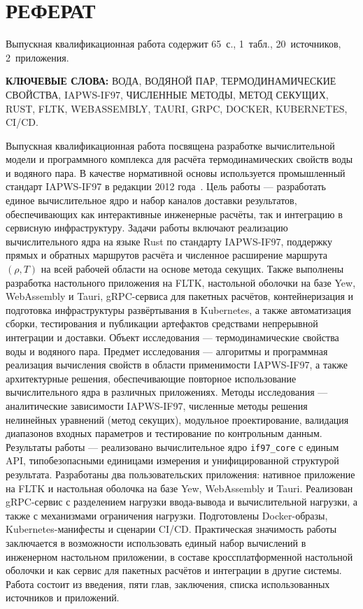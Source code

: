 \clearpage
\chapter*{РЕФЕРАТ}
Выпускная квалификационная работа содержит 65~с., 1~табл., 20~источников, 2~приложения.

\textbf{КЛЮЧЕВЫЕ СЛОВА:} ВОДА, ВОДЯНОЙ ПАР, ТЕРМОДИНАМИЧЕСКИЕ СВОЙСТВА, IAPWS-IF97, ЧИСЛЕННЫЕ МЕТОДЫ, МЕТОД СЕКУЩИХ, RUST, FLTK, WEBASSEMBLY, TAURI, GRPC, DOCKER, KUBERNETES, CI/CD.

Выпускная квалификационная работа посвящена разработке вычислительной модели и программного комплекса для расчёта термодинамических свойств воды и водяного пара.
В качестве нормативной основы используется промышленный стандарт IAPWS-IF97 в редакции 2012 года~\cite{iapws_if97_2012}.
Цель работы --- разработать единое вычислительное ядро и набор каналов доставки результатов,
обеспечивающих как интерактивные инженерные расчёты,
так и интеграцию в сервисную инфраструктуру.
Задачи работы включают реализацию вычислительного ядра на языке Rust по стандарту IAPWS-IF97,
поддержку прямых и обратных маршрутов расчёта
и численное расширение маршрута $(\rho, T)$
на всей рабочей области на основе метода секущих.
Также выполнены разработка настольного приложения на FLTK,
настольной оболочки на базе Yew, WebAssembly и Tauri,
gRPC-сервиса для пакетных расчётов,
контейнеризация и подготовка инфраструктуры развёртывания в Kubernetes,
а также автоматизация сборки, тестирования и публикации артефактов
средствами непрерывной интеграции и доставки.
Объект исследования --- термодинамические свойства воды и водяного пара.
Предмет исследования --- алгоритмы и программная реализация вычисления свойств в области применимости IAPWS-IF97, а также архитектурные решения, обеспечивающие повторное использование вычислительного ядра в различных приложениях.
Методы исследования --- аналитические зависимости IAPWS-IF97,
численные методы решения нелинейных уравнений (метод секущих),
модульное проектирование,
валидация диапазонов входных параметров
и тестирование по контрольным данным.
Результаты работы --- реализовано вычислительное ядро \texttt{if97\_core}
с единым API,
типобезопасными единицами измерения
и унифицированной структурой результата.
Разработаны два пользовательских приложения:
нативное приложение на FLTK
и настольная оболочка на базе Yew, WebAssembly и Tauri.
Реализован gRPC-сервис
с разделением нагрузки ввода-вывода и вычислительной нагрузки,
а также с механизмами ограничения нагрузки.
Подготовлены Docker-образы,
Kubernetes-манифесты
и сценарии CI/CD.
Практическая значимость работы заключается в возможности использовать
единый набор вычислений
в инженерном настольном приложении,
в составе кроссплатформенной настольной оболочки
и как сервис для пакетных расчётов и интеграции в другие системы.
Работа состоит из введения, пяти глав, заключения, списка использованных источников и приложений.
